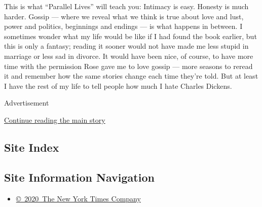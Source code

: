 This is what ``Parallel Lives'' will teach you: Intimacy is easy.
Honesty is much harder. Gossip --- where we reveal what we think is true
about love and lust, power and politics, beginnings and endings --- is
what happens in between. I sometimes wonder what my life would be like
if I had found the book earlier, but this is only a fantasy; reading it
sooner would not have made me less stupid in marriage or less sad in
divorce. It would have been nice, of course, to have more time with the
permission Rose gave me to love gossip --- more seasons to reread it and
remember how the same stories change each time they're told. But at
least I have the rest of my life to tell people how much I hate Charles
Dickens.

Advertisement

\protect\hyperlink{after-bottom}{Continue reading the main story}

\hypertarget{site-index}{%
\subsection{Site Index}\label{site-index}}

\hypertarget{site-information-navigation}{%
\subsection{Site Information
Navigation}\label{site-information-navigation}}

\begin{itemize}
\tightlist
\item
  \href{https://help.nytimes3xbfgragh.onion/hc/en-us/articles/115014792127-Copyright-notice}{©~2020~The
  New York Times Company}
\end{itemize}


